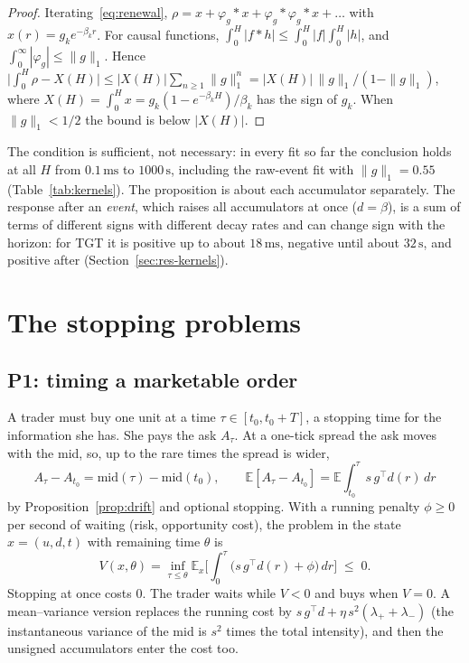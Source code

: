 \documentclass[11pt]{article}
\theoremstyle{definition}
\theoremstyle{remark}
\newcommand{\ms}{\,\text{ms}}
\newcommand{\sx}{\,\text{s}}
\newcommand{\E}{\mathbb{E}}
\begin{document}
\begin{proof}
Iterating~\eqref{eq:renewal}, $\rho = x + \varphi_g * x + \varphi_g * \varphi_g * x + \dots$ with $x(r) = g_k e^{-\beta_k r}$. For causal functions, $\int_0^H |f * h| \le \int_0^H |f| \int_0^H |h|$, and $\int_0^\infty |\varphi_g| \le \|g\|_1$. Hence $\big|\int_0^H \rho - X(H)\big| \le |X(H)| \sum_{n \ge 1} \|g\|_1^n = |X(H)|\, \|g\|_1 / (1 - \|g\|_1)$, where $X(H) = \int_0^H x = g_k (1 - e^{-\beta_k H})/\beta_k$ has the sign of $g_k$. When $\|g\|_1 < 1/2$ the bound is below $|X(H)|$.
\end{proof}

The condition is sufficient, not necessary: in every fit so far the conclusion holds at all $H$ from $0.1\ms$ to $1000\sx$, including the raw-event fit with $\|g\|_1 = 0.55$ (Table~\ref{tab:kernels}). The proposition is about each accumulator separately. The response after an \emph{event}, which raises all accumulators at once ($d = \beta$), is a sum of terms of different signs with different decay rates and can change sign with the horizon: for TGT it is positive up to about $18\ms$, negative until about $32\sx$, and positive after (Section~\ref{sec:res-kernels}).

\section{The stopping problems}
\label{sec:stopping}

\subsection{P1: timing a marketable order}
\label{sec:p1}

A trader must buy one unit at a time $\tau \in [t_0, t_0 + T]$, a stopping time for the information she has. She pays the ask $A_\tau$. At a one-tick spread the ask moves with the mid, so, up to the rare times the spread is wider,
\[
A_\tau - A_{t_0} = \mathrm{mid}(\tau) - \mathrm{mid}(t_0), \qquad \E[A_\tau - A_{t_0}] = \E\!\int_{t_0}^{\tau} s\, g^\top d(r)\,dr
\]
by Proposition~\ref{prop:drift} and optional stopping. With a running penalty $\phi \ge 0$ per second of waiting (risk, opportunity cost), the problem in the state $x = (u, d, t)$ with remaining time $\theta$ is
\begin{equation}
V(x, \theta) = \inf_{\tau \le \theta} \E_x\Big[\int_0^\tau \big(s\, g^\top d(r) + \phi\big)\,dr\Big] \;\le\; 0 .
\label{eq:value}
\end{equation}
Stopping at once costs 0. The trader waits while $V < 0$ and buys when $V = 0$. A mean--variance version replaces the running cost by $s\,g^\top d + \eta\, s^2 (\lambda_+ + \lambda_-)$ (the instantaneous variance of the mid is $s^2$ times the total intensity), and then the unsigned accumulators enter the cost too.
\end{document}
